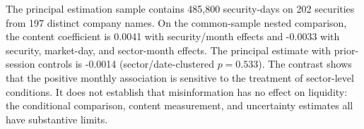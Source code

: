 The principal estimation sample contains 485,800 security-days on 202 securities from 197 distinct company names. On the common-sample nested comparison, the content coefficient is 0.0041 with security/month effects and -0.0033 with security, market-day, and sector-month effects. The principal estimate with prior-session controls is -0.0014 (sector/date-clustered $p=0.533$). The contrast shows that the positive monthly association is sensitive to the treatment of sector-level conditions. It does not establish that misinformation has no effect on liquidity: the conditional comparison, content measurement, and uncertainty estimates all have substantive limits.
